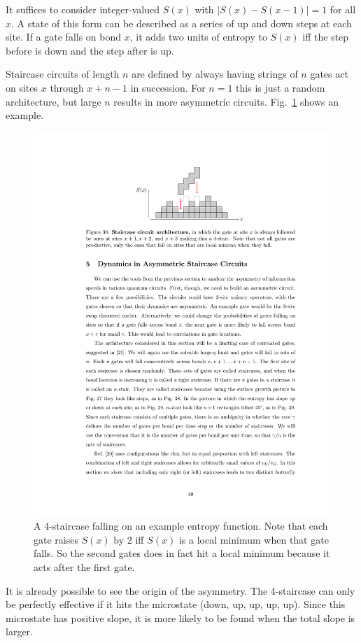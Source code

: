 \documentclass[aps,prx,reprint,superscriptaddress, longbibliography]{revtex4-1}
\begin{document}
It suffices to consider integer-valued $S(x)$ with $|S(x)-S(x-1)|=1$ for all $x$. A state of this form can be described as a series of up and down steps at each site. If a gate falls on bond $x$, it adds two units of entropy to $S(x)$ iff the step before is down and the step after is up.

Staircase circuits of length $n$ are defined by always having strings of $n$ gates act on sites $x$ through $x+n-1$ in succession. For $n=1$ this is just a random architecture, but large $n$ results in more asymmetric circuits. Fig.~\ref{fig:stairs} shows an example.
\begin{figure}
	\includegraphics[width=\columnwidth]{stairs}
	\caption{A 4-staircase falling on an example entropy function. Note that each gate raises $S(x)$ by 2 iff $S(x)$ is a local minimum when that gate falls. So the second gates does in fact hit a local minimum because it acts after the first gate.}
	\label{fig:stairs}
\end{figure}
It is already possible to see the origin of the asymmetry. The 4-staircase can only be perfectly effective if it hits the microstate (down, up, up, up, up). Since this microstate has positive slope, it is more likely to be found when the total slope is larger.
\end{document}
